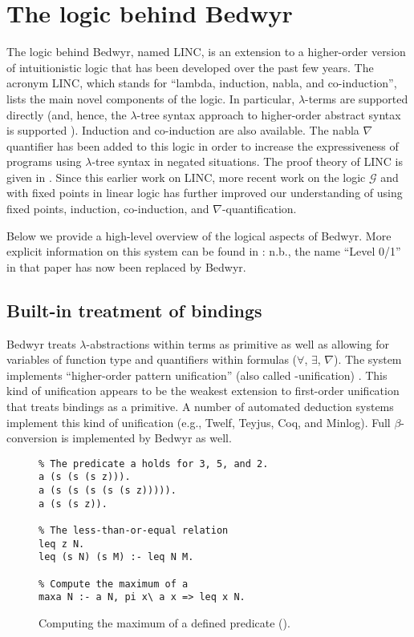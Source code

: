\section{The logic behind Bedwyr}
\label{logic}

The logic behind Bedwyr, named LINC, is an extension to a higher-order
version of intuitionistic logic that has been developed over the past
few years.  The acronym LINC, which stands for ``lambda, induction,
nabla, and co-induction'', lists the main novel components of the
logic.  In particular, $\lambda$-terms are supported directly (and,
hence, the $\lambda$-tree syntax approach to higher-order abstract
syntax is supported \cite{miller00cl}).  Induction and co-induction
are also available.  The nabla $\nabla$ quantifier has been added to
this logic in order to increase the expressiveness of programs using
$\lambda$-tree syntax in negated situations.  The proof theory of LINC
is given in \cite{miller05tocl,tiu04phd}.  Since this earlier work on
LINC, more recent work on the logic $\mathcal{G}$
\cite{gacek.twolevel,gacek11ic} and with fixed points in linear logic
\cite{baelde08phd,baelde12tocl} has further improved our understanding
of using fixed points, induction, co-induction, and
$\nabla$-quantification.

Below we provide a high-level overview of the logical aspects of Bedwyr.
More explicit information on this system can be found in
\cite{tiu05eshol}: n.b., the name ``Level 0/1'' in that paper has now
been replaced by Bedwyr.

\subsection{Built-in treatment of bindings}

Bedwyr treats $\lambda$-abstractions within terms as primitive as well
as allowing for variables of function type and quantifiers within
formulas ($\forall$, $\exists$, $\nabla$).  The system
implements ``higher-order pattern unification'' (also called
\Ll-unification) \cite{miller91jlc}.   This kind of unification
appears to be the weakest extension to first-order unification that
treats bindings as a primitive.  A number of automated deduction systems
implement this kind of unification (e.g., Twelf, Teyjus, Coq, and
Minlog).  Full $\beta$-conversion is implemented by Bedwyr as well.

\begin{figure}
\begin{verbatim}
% The predicate a holds for 3, 5, and 2.
a (s (s (s z))).
a (s (s (s (s (s z))))).
a (s (s z)).

% The less-than-or-equal relation
leq z N.
leq (s N) (s M) :- leq N M.

% Compute the maximum of a
maxa N :- a N, pi x\ a x => leq x N.
\end{verbatim}
\caption{Computing the maximum of a defined predicate (\lp).}
\label{maxa-lp}
\end{figure}

